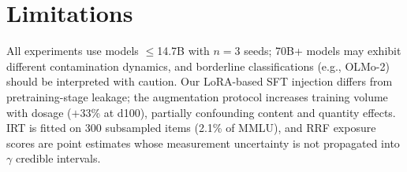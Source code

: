 \section*{Limitations}
\label{sec:limitations}

All experiments use models $\leq$14.7B with $n\!=\!3$ seeds; 70B+ models may exhibit different contamination dynamics, and borderline classifications (e.g., OLMo-2) should be interpreted with caution. Our LoRA-based SFT injection differs from pretraining-stage leakage; the augmentation protocol increases training volume with dosage ($+$33\% at d100), partially confounding content and quantity effects. IRT is fitted on 300 subsampled items (2.1\% of MMLU), and RRF exposure scores are point estimates whose measurement uncertainty is not propagated into $\gamma$ credible intervals.
